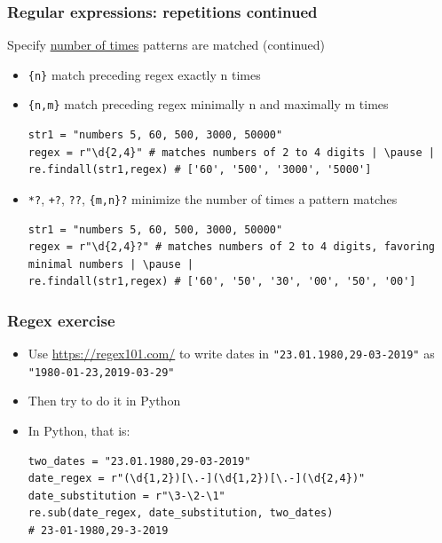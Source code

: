 \documentclass[xcolor=table]{beamer}
\begin{document}
\begin{frame}[fragile]
    \frametitle{Regular expressions: repetitions continued}
    Specify \href{https://docs.python.org/3.7/library/re.html#regular-expression-syntax}{number of times} patterns are matched (continued)
    \begin{itemize} \pause
        \item\texttt{\{n\}} match preceding regex exactly n times \pause
        \item\texttt{\{n,m\}} match preceding regex minimally n and maximally m times \pause
\begin{lstlisting}[style=python,belowskip=-1.5 \baselineskip]
str1 = "numbers 5, 60, 500, 3000, 50000"
regex = r"\d{2,4}" # matches numbers of 2 to 4 digits | \pause |  
re.findall(str1,regex) # ['60', '500', '3000', '5000']
\end{lstlisting} \pause
        \item\texttt{*?}, \texttt{+?}, \texttt{??}, \texttt{\{m,n\}?} minimize the number of times a pattern matches \pause
\begin{lstlisting}[style=python,belowskip=-1.5 \baselineskip]
str1 = "numbers 5, 60, 500, 3000, 50000"
regex = r"\d{2,4}?" # matches numbers of 2 to 4 digits, favoring minimal numbers | \pause |  
re.findall(str1,regex) # ['60', '50', '30', '00', '50', '00']
\end{lstlisting} \pause
    \end{itemize}
\end{frame}


\begin{frame}[fragile]
    \frametitle{Regex exercise}
    \begin{itemize}
        \item Use \url{https://regex101.com/} to write dates in \texttt{"23.01.1980,29-03-2019"} as \texttt{"1980-01-23,2019-03-29"} \pause
        \item Then try to do it in Python \pause 
        \item In Python, that is:
\begin{lstlisting}[style=python,belowskip=-1.5 \baselineskip]
two_dates = "23.01.1980,29-03-2019" 
date_regex = r"(\d{1,2})[\.-](\d{1,2})[\.-](\d{2,4})"
date_substitution = r"\3-\2-\1"
re.sub(date_regex, date_substitution, two_dates)
# 23-01-1980,29-3-2019 
\end{lstlisting} 
    \end{itemize}
\end{frame}
\end{document}
